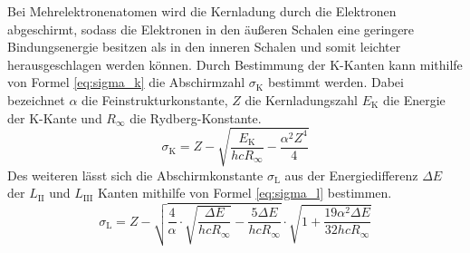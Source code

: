 Bei Mehrelektronenatomen wird die Kernladung durch die Elektronen
abgeschirmt, sodass die Elektronen in den äußeren Schalen eine geringere
Bindungsenergie besitzen als in den inneren Schalen und somit leichter
herausgeschlagen werden können. Durch Bestimmung der K-Kanten kann
mithilfe von Formel \eqref{eq:sigma_k} die Abschirmzahl
$\sigma_\mathrm{K}$ bestimmt werden. Dabei bezeichnet $\alpha$ die
Feinstrukturkonstante, $Z$ die Kernladungszahl $E_\text{K}$ die Energie
der K-Kante und $R_\infty$ die Rydberg-Konstante.
%
\begin{equation}
  \sigma_\text{K} = Z - \sqrt{\frac{E_\text{K}}{h c R_\infty} 
    - \frac{\alpha^2 Z^4}{4}}
\label{eq:sigma_k}
\end{equation}
% 
Des weiteren lässt sich die Abschirmkonstante $\sigma_\text{L}$ aus der
Energiedifferenz $\Delta E$ der $L_\mathrm{II}$ und $L_\mathrm{III}$
Kanten mithilfe von Formel \eqref{eq:sigma_l} bestimmen.
%
\begin{equation}
\sigma_\text{L} = Z - \sqrt{\frac{4}{\alpha} \cdot \sqrt{\frac{\Delta
      E}{h c R_\infty}} - \frac{5 \Delta E}{h c R_\infty}} \cdot \sqrt{ 1
  + \frac{19 \alpha ^2 \Delta E}{32h c R_\infty}}
\label{eq:sigma_l}
\end{equation}
%